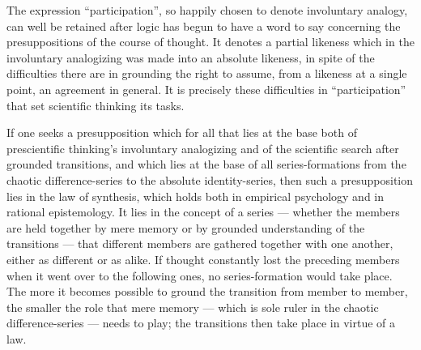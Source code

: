 \documentclass[12pt]{book}
\newcommand{\opage}[1]{\marginnote{\footnotesize\textit{[#1]}}}
\begin{document}
The expression ``participation'', so happily chosen to denote involuntary
analogy, can well be retained after logic has begun to have a word to say
concerning the presuppositions of the course of thought. It denotes a partial
likeness which in the involuntary analogizing was made into an absolute
\opage{40}likeness, in spite of the difficulties there are in grounding the right to
assume, from a likeness at a single point, an agreement in general. It is
precisely these difficulties in ``participation'' that set scientific thinking
its tasks.

If one seeks a presupposition which for all that lies at the base both of
prescientific thinking's involuntary analo\-giz\-ing and of the sci\-en\-tific search
after grounded tran\-si\-tions, and which lies at the base of all series-formations
from the chaotic difference-series to the absolute identity-series, then such a
presupposition lies in the law of synthesis, which holds both in empirical
psychology and in rational epistemology. It lies in the concept of a series ---
whether the members are held together by mere memory or by grounded
understanding of the transitions --- that different members are gathered
together with one another, either as different or as alike. If thought
constantly lost the preceding members when it went over to the following ones,
no series-formation would take place. The more it becomes possible to ground the
transition from member to member, the smaller the role that mere memory ---
which is sole ruler in the chaotic difference-series --- needs to play; the
transitions then take place in virtue of a law.
\end{document}
